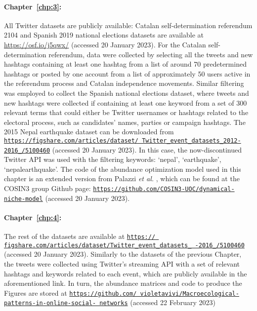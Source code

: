 \paragraph{Chapter~\ref{chp:3}:} All Twitter datasets are publicly available: Catalan self-determination referendum 2104 and Spanish  2019 national elections datasets are available at \url{https://osf.io/j5qwx/} (accessed 20 January 2023). For the Catalan self-determination referendum, data were collected by selecting all the tweets and new hashtags containing at least one hashtag from a list of around 70 predetermined hashtags or posted by one account from a list of approximately 50 users active in the referendum process and Catalan independence movements. Similar filtering was employed to collect the Spanish national elections dataset, where tweets and new hashtags were collected if containing at least one keyword from a set of 300 relevant terms that could either be Twitter usernames or hashtags related to the electoral process, such as candidates’ names, parties or campaign hashtags. The 2015 Nepal earthquake dataset can be downloaded from \href{https://figshare.com/articles/dataset/Twitter_event_datasets_2012-2016_/5100460}{\texttt{https://figshare.com/articles/dataset/ \newline Twitter\_event\_datasets\_2012-2016\_/5100460}} \newline (accessed 20 January 2023). In this case, the now-discontinued Twitter API was used with the filtering keywords: ‘nepal’, ‘earthquake’, ‘nepalearthquake’. The code of the abundance optimization model used in this chapter is an extended version from Palazzi \textit{et al.}  \cite{palazzi2021ecological}, which can be found at the COSIN3 group Github page: \newline
\href{https://github.com/COSIN3-UOC/dynamical-niche-model}{\texttt{https://github.com/COSIN3-UOC/dynamical-niche-model}} \newline(accessed 20 January 2023). 


\paragraph{Chapter~\ref{chp:4}:} The rest of the datasets are available at \href{https://figshare.com/articles/dataset/Twitter_event_datasets_2012-2016_/5100460}{\texttt{https:// figshare.com/articles/dataset/Twitter\_event\_datasets\_ -2016\_/5100460}} (accessed 20 January 2023). Similarly to the datasets of the previous Chapter, the tweets were collected using Twitter’s streaming API with a set of relevant hashtags and keywords related to each event,  which are publicly available in the aforementioned link. In turn, the abundance matrices and code to produce the Figures are stored at \href{https://github.com/violetavivi/Macroecological-patterns-in-online-social-networks}{\texttt{https://github.com/ \newline violetavivi/Macroecological-patterns-in-online-social- \newline networks}} (accessed 22 February 2023)